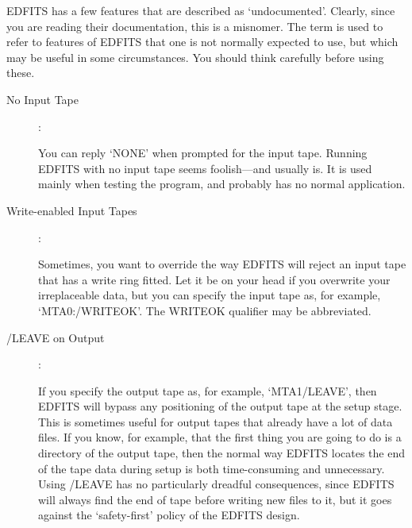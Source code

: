 EDFITS has a few features that are described as `undocumented'.  Clearly,
since you are reading their documentation, this is a misnomer.  The term is
used to refer to features of EDFITS that one is not normally expected to use,
but which may be useful in some circumstances.  You should think carefully
before using these.
\begin{description}

\item[No Input Tape]:

You can reply `NONE' when prompted for the input tape.
Running EDFITS with no input tape seems foolish---and usually is.  It is
used mainly when testing the program, and probably has no normal application.

\item[Write-enabled Input Tapes]:

Sometimes, you want to override the way
EDFITS will reject an input tape that has a write ring fitted.  Let it be
on your head if you overwrite your irreplaceable data, but you can specify
the input tape as, for example, `MTA0:/WRITEOK'.  The WRITEOK qualifier
may be abbreviated.
\item[/LEAVE on Output]:

If you specify the output tape as, for example,
`MTA1/LEAVE', then EDFITS will bypass any positioning of the output tape
at the setup stage.  This is sometimes useful for output tapes that
already have a lot of data files. If you know, for example, that the first
thing you are going to do is a directory of the output tape, then the
normal way EDFITS locates the end of the tape data during setup is both
time-consuming and unnecessary.  Using /LEAVE has no particularly dreadful
consequences, since EDFITS will always find the end of tape before writing
new files to it, but it goes against the `safety-first' policy of the
EDFITS design.
\end{description}

